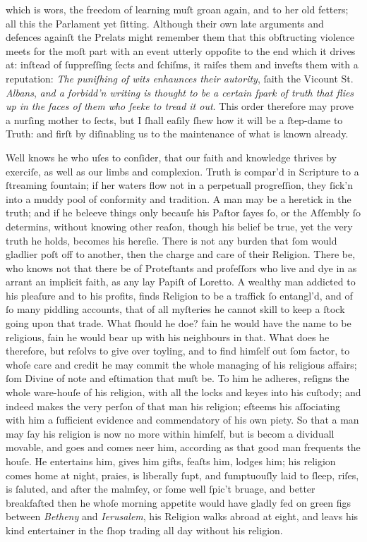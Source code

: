 which is wors, the freedom of learning muſt groan again, and to her old fetters;
all this the Parlament yet ſitting.  Although their own late arguments and
defences againſt the Prelats might remember them that this obſtructing violence
meets for the moſt part with an event utterly oppoſite to the end which it
drives at: inſtead of ſuppreſſing ſects and ſchiſms, it raiſes them and inveſts
them with a reputation: \textit{The puniſhing of wits enhaunces their autority},
ſaith the Vicount St. \textit{Albans}, \textit{and a forbidd'n writing is
thought to be a certain ſpark of truth that flies up in the faces of them who
ſeeke to tread it out}.  This order therefore may prove a nurſing mother to
ſects, but I ſhall eaſily ſhew how it will be a ſtep-dame to Truth: and firſt by
diſinabling us to the maintenance of what is known already.

Well knows he who uſes to conſider, that our faith and knowledge thrives by
exerciſe, as well as our limbs and complexion.  Truth is compar'd in Scripture
to a ſtreaming fountain; if her waters flow not in a perpetuall progreſſion,
they ſick'n into a muddy pool of conformity and tradition.  A man may be a
heretick in the truth; and if he beleeve things only becauſe his Paſtor ſayes
ſo, or the Aſſembly ſo determins, without knowing other reaſon, though his
belief be true, yet the very truth he holds, becomes his hereſie.  There is not
any burden that ſom would gladlier poſt off to another, then the charge and care
of their Religion.  There be, who knows not that there be of Proteſtants and
profeſſors who live and dye in as arrant an implicit faith, as any lay Papiſt of
Loretto.  A wealthy man addicted to his pleaſure and to his profits, finds
Religion to be a traffick ſo entangl'd, and of ſo many piddling accounts, that
of all myſteries he cannot skill to keep a ſtock going upon that trade.  What
ſhould he doe? fain he would have the name to be religious, fain he would bear
up with his neighbours in that.  What does he therefore, but reſolvs to give
over toyling, and to find himſelf out ſom factor, to whoſe care and credit he
may commit the whole managing of his religious affairs; ſom Divine of note and
eſtimation that muſt be.  To him he adheres, reſigns the whole ware-houſe of his
religion, with all the locks and keyes into his cuſtody; and indeed makes the
very perſon of that man his religion; eſteems his aſſociating with him a
ſufficient evidence and commendatory of his own piety.  So that a man may ſay
his religion is now no more within himſelf, but is becom a dividuall movable,
and goes and comes neer him, according as that good man frequents the houſe.  He
entertains him, gives him gifts, feaſts him, lodges him; his religion comes home
at night, praies, is liberally ſupt, and ſumptuouſly laid to ſleep, riſes, is
ſaluted, and after the malmſey, or ſome well ſpic't bruage, and better
breakfaſted then he whoſe morning appetite would have gladly fed on green figs
between \textit{Betheny} and \textit{Ierusalem}, his Religion walks abroad at
eight, and leavs his kind entertainer in the ſhop trading all day without his
religion.

